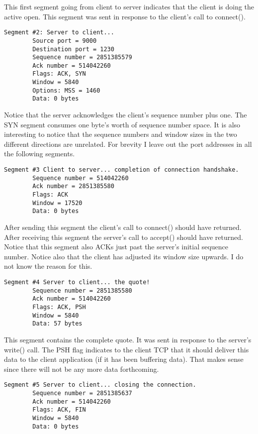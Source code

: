 \documentclass{article}
\begin{document}
This first segment going from client to server indicates that the client is doing the active
open. This segment was sent in response to the client's call to connect().

\begin{verbatim}
Segment #2: Server to client...
        Source port = 9000
        Destination port = 1230
        Sequence number = 2851385579
        Ack number = 514042260
        Flags: ACK, SYN
        Window = 5840
        Options: MSS = 1460
        Data: 0 bytes
\end{verbatim}

Notice that the server acknowledges the client's sequence number plus one. The SYN segment
consumes one byte's worth of sequence number space. It is also interesting to notice that the
sequence numbers and window sizes in the two different directions are unrelated. For brevity I
leave out the port addresses in all the following segments.

\begin{verbatim}
Segment #3 Client to server... completion of connection handshake.
        Sequence number = 514042260
        Ack number = 2851385580
        Flags: ACK
        Window = 17520
        Data: 0 bytes
\end{verbatim}

After sending this segment the client's call to connect() should have returned. After receiving
this segment the server's call to accept() should have returned. Notice that this segment also
ACKs just past the server's initial sequence number. Notice also that the client has adjusted
its window size upwards. I do not know the reason for this.

\begin{verbatim}
Segment #4 Server to client... the quote!
        Sequence number = 2851385580
        Ack number = 514042260
        Flags: ACK, PSH
        Window = 5840
        Data: 57 bytes
\end{verbatim}

This segment contains the complete quote. It was sent in response to the server's write() call.
The PSH flag indicates to the client TCP that it should deliver this data to the client
application (if it has been buffering data). That makes sense since there will not be any more
data forthcoming.

\begin{verbatim}
Segment #5 Server to client... closing the connection.
        Sequence number = 2851385637
        Ack number = 514042260
        Flags: ACK, FIN
        Window = 5840
        Data: 0 bytes
\end{verbatim}
\end{document}
